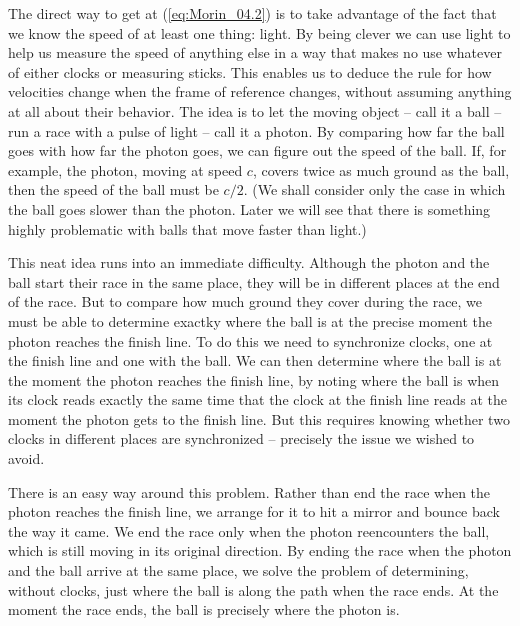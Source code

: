 The direct way to get at (\ref{eq:Morin_04.2}) is to take advantage of the fact that we know the speed of at least one thing: light. By being clever we can use light to help us measure the speed of anything else in a way that makes no use whatever of either clocks or measuring sticks. This enables us to  deduce the rule for how velocities change when the frame of reference changes, without assuming anything at all about their behavior. The idea is to let the moving object -- call it a ball -- run a  race with a pulse of light -- call it a photon. By comparing how far the ball goes with how far the photon goes, we can figure out the speed of the ball. If, for example, the photon, moving at speed $c$, covers twice as much ground as the ball, then the speed of the ball must be $c/2$. (We shall consider only the case in which the ball goes slower than the photon. Later we will see that there is something highly problematic with balls that move faster than light.)

This neat idea runs into an immediate difficulty. Although the photon and the ball  start their race in the same place, they will be in different places at the end of the race. But to compare how much ground they cover during the race, we must be able to determine exactky where the ball is at the precise moment the photon reaches the finish line. To do this we need to synchronize clocks, one at the finish line and one with the ball. We can then determine where the ball is at the moment the photon reaches the finish line, by noting where the ball is when its clock reads exactly the same time that the clock at the finish line reads at the moment the photon gets to the finish line. But this requires knowing whether two clocks in different places are synchronized -- precisely the issue we wished to avoid. 

There is an easy way around this problem. Rather than end the race when the photon reaches the finish line, we arrange for it to hit a mirror and bounce back the way it came. We end the race only when the photon reencounters the ball, which is still moving in its original direction. By ending the race when the photon and the ball arrive at the same place, we solve the problem of determining, without clocks, just where the ball is along the path when the race ends. At the moment the race ends, the ball is precisely where the photon is.

